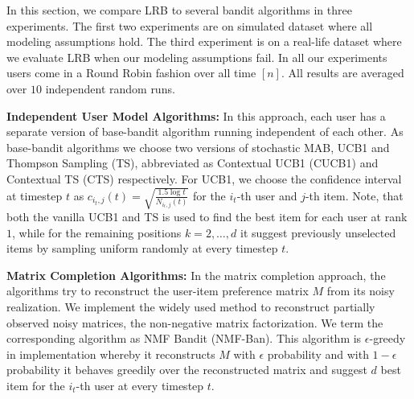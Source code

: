 In this section, we compare LRB to several bandit algorithms in three experiments. The first two experiments are on simulated dataset where all modeling assumptions hold. The third experiment is on a real-life dataset where we evaluate LRB when our modeling assumptions fail. In all our experiments users come in a Round Robin fashion over all time $[n]$. All results are averaged over $10$ independent random runs.



\textbf{Independent User Model Algorithms:} In this approach, each user has a separate version of base-bandit algorithm running independent of each other. As base-bandit algorithms we choose two versions of stochastic MAB, UCB1 and Thompson Sampling (TS), abbreviated as Contextual UCB1 (CUCB1) and Contextual TS (CTS) respectively. For UCB1, we choose the confidence interval at timestep $t$ as $c_{i_t, j}(t) = \sqrt{\frac{1.5 \log t}{N_{i_t,j}(t)}}$ for the $i_t$-th user and $j$-th item. Note, that both the vanilla UCB1 and TS is used to find the best item for each user at rank $1$, while for the remaining positions $k= 2,\dots, d$ it suggest previously unselected items by sampling uniform randomly at every timestep $t$. 


%

\textbf{Matrix Completion Algorithms:} In the matrix completion approach, the algorithms try to reconstruct the user-item preference matrix $M$ from its noisy realization. We implement the widely used method to reconstruct partially observed noisy matrices, the non-negative matrix factorization. We term the corresponding algorithm as NMF Bandit (NMF-Ban). This algorithm is $\epsilon$-greedy in implementation whereby it reconstructs $M$ with $\epsilon$ probability and with $1-\epsilon$ probability it behaves greedily over the reconstructed matrix and suggest $d$ best item for the $i_t$-th user at every timestep $t$. 

